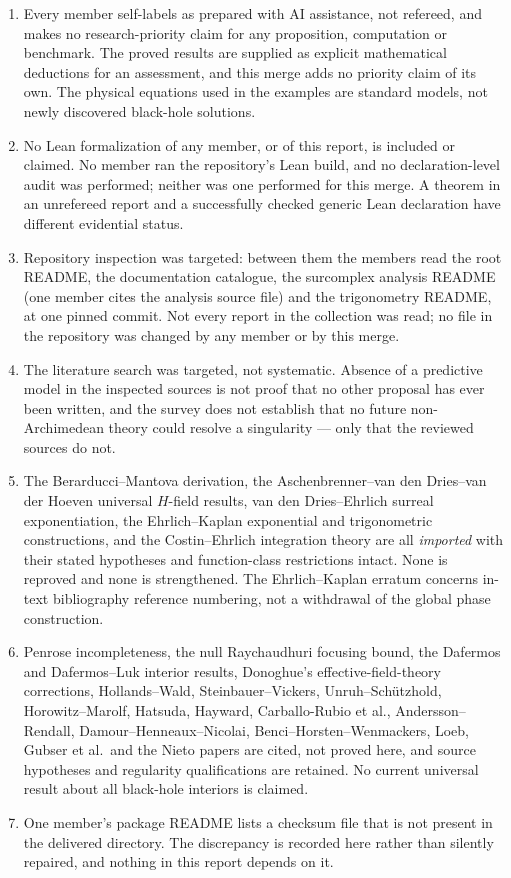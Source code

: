 \documentclass[11pt,letterpaper]{article}
\numberwithin{equation}{section}
\theoremstyle{definition}
\theoremstyle{remark}
\begin{document}
\begin{enumerate}[label=\textup{N\arabic*.},leftmargin=3.0em]
\item Every member self-labels as prepared with AI assistance, not refereed,
and makes no research-priority claim for any proposition, computation or
benchmark. The proved results are supplied as explicit mathematical deductions
for an assessment, and this merge adds no priority claim of its own. The
physical equations used in the examples are standard models, not newly
discovered black-hole solutions.
\item No Lean formalization of any member, or of this report, is included or
claimed. No member ran the repository's Lean build, and no declaration-level
audit was performed; neither was one performed for this merge. A theorem in an
unrefereed report and a successfully checked generic Lean declaration have
different evidential status.
\item Repository inspection was targeted: between them the members read the
root README, the documentation catalogue, the surcomplex analysis README (one
member cites the analysis source file) and the trigonometry README, at one
pinned commit. Not every report in the collection was read; no file in the
repository was changed by any member or by this merge.
\item The literature search was targeted, not systematic. Absence of a
predictive model in the inspected sources is not proof that no other proposal
has ever been written, and the survey does not establish that no future
non-Archimedean theory could resolve a singularity --- only that the reviewed
sources do not.
\item The Berarducci--Mantova derivation, the Aschenbrenner--van den
Dries--van der Hoeven universal $H$-field results, van den Dries--Ehrlich
surreal exponentiation, the Ehrlich--Kaplan exponential and trigonometric
constructions, and the Costin--Ehrlich integration theory are all
\emph{imported} with their stated hypotheses and function-class restrictions
intact. None is reproved and none is strengthened. The Ehrlich--Kaplan erratum
concerns in-text bibliography reference numbering, not a withdrawal of the
global phase construction.
\item Penrose incompleteness, the null Raychaudhuri focusing bound, the
Dafermos and Dafermos--Luk interior results, Donoghue's effective-field-theory
corrections, Hollands--Wald, Steinbauer--Vickers, Unruh--Sch\"utzhold,
Horowitz--Marolf, Hatsuda, Hayward, Carballo-Rubio et al.,
Andersson--Rendall, Damour--Henneaux--Nicolai, Benci--Horsten--Wenmackers,
Loeb, Gubser et al.\ and the Nieto papers are cited, not proved here, and
source hypotheses and regularity qualifications are retained. No current
universal result about all black-hole interiors is claimed.
\item One member's package README lists a checksum file that is not present in
the delivered directory. The discrepancy is recorded here rather than silently
repaired, and nothing in this report depends on it.
\end{enumerate}
\end{document}

